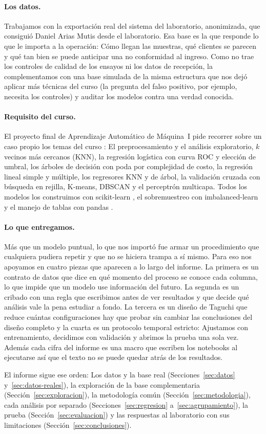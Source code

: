 \paragraph{Los datos.} Trabajamos con la exportación real del sistema del
laboratorio, anonimizada, que consiguió Daniel Arias Mutis desde el
laboratorio. Esa base es la que responde lo que le importa a la operación:
Cómo llegan las muestras, qué clientes se parecen y qué tan bien se puede
anticipar una no conformidad al ingreso. Como no trae los controles de
calidad de los ensayos ni los datos de recepción, la complementamos con una
base simulada de la misma estructura que nos dejó aplicar más técnicas del
curso (la pregunta del falso positivo, por ejemplo, necesita los controles) y
auditar los modelos contra una verdad conocida.

\paragraph{Requisito del curso.} El proyecto final de Aprendizaje Automático
de Máquina~I pide recorrer sobre un caso propio los temas del curso
\cite{muller2016}: El preprocesamiento y el análisis exploratorio, $k$ vecinos
más cercanos (KNN), la regresión logística con curva ROC y elección de umbral,
los árboles de decisión con poda por complejidad de costo, la regresión
lineal simple y múltiple, los regresores KNN y de árbol, la validación cruzada
con búsqueda en rejilla, K-means, DBSCAN y el perceptrón multicapa. Todos los
modelos los construimos con scikit-learn \cite{pedregosa2011}, el
sobremuestreo con imbalanced-learn \cite{lemaitre2017} y el manejo de tablas
con pandas \cite{mckinney2010}.

\paragraph{Lo que entregamos.} Más que un modelo puntual, lo que nos importó
fue armar un procedimiento que cualquiera pudiera repetir y que no se hiciera
trampa a sí mismo. Para eso nos apoyamos en cuatro piezas que aparecen a lo
largo del informe. La primera es un contrato de datos que dice en qué momento
del proceso se conoce cada columna, lo que impide que un modelo use
información del futuro. La segunda es un cribado con una regla que escribimos
antes de ver resultados y que decide qué análisis vale la pena estudiar a
fondo. La tercera es un diseño de Taguchi que reduce cuántas configuraciones
hay que probar sin cambiar las conclusiones del diseño completo y la cuarta
es un protocolo temporal estricto: Ajustamos con entrenamiento, decidimos con
validación y abrimos la prueba una sola vez. Además cada cifra del informe es
una macro que escriben los notebooks al ejecutarse así que el texto no se
puede quedar atrás de los resultados.

El informe sigue ese orden: Los datos y la base real
(Secciones~\ref{sec:datos} y~\ref{sec:datos-reales}), la exploración de la
base complementaria (Sección~\ref{sec:exploracion}), la metodología común
(Sección~\ref{sec:metodologia}), cada análisis por separado
(Secciones~\ref{sec:regresion} a~\ref{sec:agrupamiento}), la prueba
(Sección~\ref{sec:evaluacion}) y las respuestas al laboratorio con sus
limitaciones (Sección~\ref{sec:conclusiones}).

